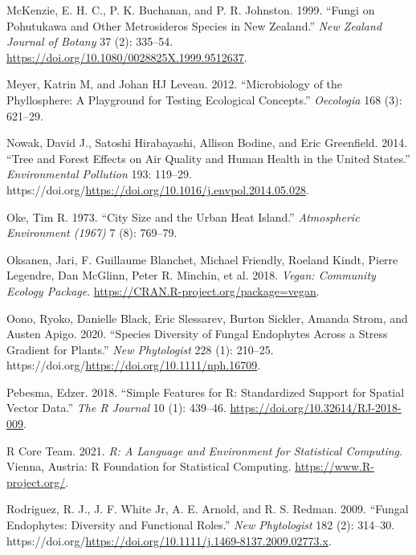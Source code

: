 \documentclass[fleqn,10pt,lineno]{wlpeerj} %
\newlength{\cslhangindent}
\newenvironment{CSLReferences}[2] %
 {%
  \setlength{\parindent}{0pt}
  \ifodd #1 \everypar{\setlength{\hangindent}{\cslhangindent}}\ignorespaces\fi
  \ifnum #2 > 0
  \setlength{\parskip}{#2\baselineskip}
  \fi
 }%
 {}
\begin{document}
\begin{CSLReferences}{1}{0}
\leavevmode{}%
McKenzie, E. H. C., P. K. Buchanan, and P. R. Johnston. 1999. {``Fungi on Pohutukawa and Other Metrosideros Species in New Zealand.''} \emph{New Zealand Journal of Botany} 37 (2): 335--54. \url{https://doi.org/10.1080/0028825X.1999.9512637}.

\leavevmode{}%
Meyer, Katrin M, and Johan HJ Leveau. 2012. {``Microbiology of the Phyllosphere: A Playground for Testing Ecological Concepts.''} \emph{Oecologia} 168 (3): 621--29.

\leavevmode{}%
Nowak, David J., Satoshi Hirabayashi, Allison Bodine, and Eric Greenfield. 2014. {``Tree and Forest Effects on Air Quality and Human Health in the United States.''} \emph{Environmental Pollution} 193: 119--29. https://doi.org/\url{https://doi.org/10.1016/j.envpol.2014.05.028}.

\leavevmode{}%
Oke, Tim R. 1973. {``City Size and the Urban Heat Island.''} \emph{Atmospheric Environment (1967)} 7 (8): 769--79.

\leavevmode{}%
Oksanen, Jari, F. Guillaume Blanchet, Michael Friendly, Roeland Kindt, Pierre Legendre, Dan McGlinn, Peter R. Minchin, et al. 2018. \emph{Vegan: Community Ecology Package}. \url{https://CRAN.R-project.org/package=vegan}.

\leavevmode{}%
Oono, Ryoko, Danielle Black, Eric Slessarev, Burton Sickler, Amanda Strom, and Austen Apigo. 2020. {``Species Diversity of Fungal Endophytes Across a Stress Gradient for Plants.''} \emph{New Phytologist} 228 (1): 210--25. https://doi.org/\url{https://doi.org/10.1111/nph.16709}.

\leavevmode{}%
Pebesma, Edzer. 2018. {``{Simple Features for R: Standardized Support for Spatial Vector Data}.''} \emph{{The R Journal}} 10 (1): 439--46. \url{https://doi.org/10.32614/RJ-2018-009}.

\leavevmode{}%
R Core Team. 2021. \emph{R: A Language and Environment for Statistical Computing}. Vienna, Austria: R Foundation for Statistical Computing. \url{https://www.R-project.org/}.

\leavevmode{}%
Rodriguez, R. J., J. F. White Jr, A. E. Arnold, and R. S. Redman. 2009. {``Fungal Endophytes: Diversity and Functional Roles.''} \emph{New Phytologist} 182 (2): 314--30. https://doi.org/\url{https://doi.org/10.1111/j.1469-8137.2009.02773.x}.


\end{CSLReferences}
\end{document}
